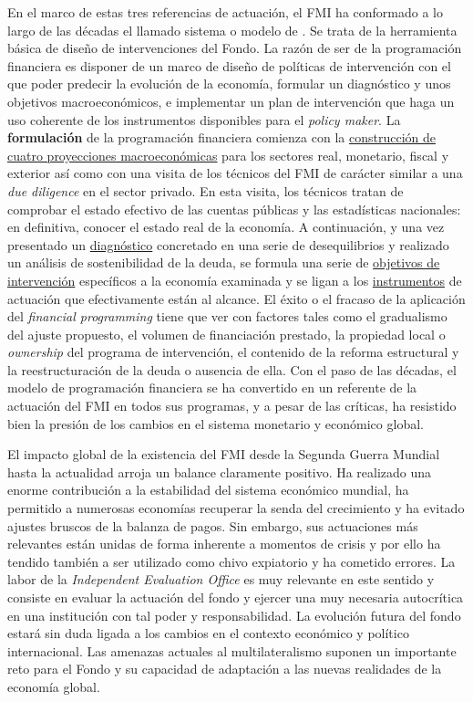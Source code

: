 \documentclass{nuevotema}
\begin{document}
En el marco de estas tres referencias de actuación, el FMI ha conformado a lo largo de las décadas el llamado sistema o modelo de . Se trata de la herramienta básica de diseño de intervenciones del Fondo. La razón de ser de la programación financiera es disponer de un marco de diseño de políticas de intervención con el que poder predecir la evolución de la economía, formular un diagnóstico y unos objetivos macroeconómicos, e implementar un plan de intervención que haga un uso coherente de los instrumentos disponibles para el \textit{policy maker}. La \textbf{formulación} de la programación financiera comienza con la \underline{construcción de cuatro proyecciones macroeconómicas} para los sectores real, monetario, fiscal y exterior así como con una visita de los técnicos del FMI de carácter similar a una \textit{due diligence} en el sector privado. En esta visita, los técnicos tratan de comprobar el estado efectivo de las cuentas públicas y las estadísticas nacionales: en definitiva, conocer el estado real de la economía. A continuación, y una vez presentado un \underline{diagnóstico} concretado en una serie de desequilibrios y realizado un análisis de sostenibilidad de la deuda, se formula una serie de \underline{objetivos de intervención} específicos a la economía examinada y se ligan a los \underline{instrumentos} de actuación que efectivamente están al alcance. El éxito o el fracaso de la aplicación del \textit{financial programming} tiene que ver con factores tales como el gradualismo del ajuste propuesto, el volumen de financiación prestado, la propiedad local o \textit{ownership} del programa de intervención, el contenido de la reforma estructural y la reestructuración de la deuda o ausencia de ella. Con el paso de las décadas, el modelo de programación financiera se ha convertido en un referente de la actuación del FMI en todos sus programas, y a pesar de las críticas, ha resistido bien la presión de los cambios en el sistema monetario y económico global. 

El impacto global de la existencia del FMI desde la Segunda Guerra Mundial hasta la actualidad arroja un balance claramente positivo. Ha realizado una enorme contribución a la estabilidad del sistema económico mundial, ha permitido a numerosas economías recuperar la senda del crecimiento y ha evitado ajustes bruscos de la balanza de pagos. Sin embargo, sus actuaciones más relevantes están unidas de forma inherente a momentos de crisis y por ello ha tendido también a ser utilizado como chivo expiatorio y ha cometido errores. La labor de la \textit{Independent Evaluation Office} es muy relevante en este sentido y consiste en evaluar la actuación del fondo y ejercer una muy necesaria autocrítica en una institución con tal poder y responsabilidad. La evolución futura del fondo estará sin duda ligada a los cambios en el contexto económico y político internacional. Las amenazas actuales al multilateralismo suponen un importante reto para el Fondo y su capacidad de adaptación a las nuevas realidades de la economía global.
\end{document}
